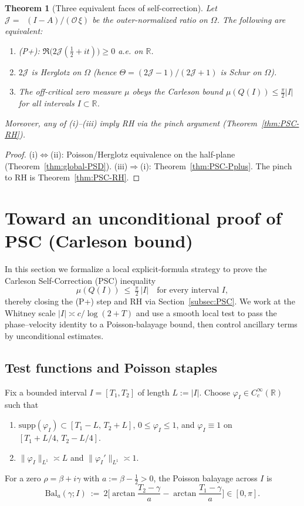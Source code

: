 \documentclass[11pt]{article}
\newtheorem{theorem}{Theorem}
\theoremstyle{definition}
\theoremstyle{remark}
\newcommand{\R}{\mathbb{R}}
\DeclareMathOperator{\dettwo}{det_2}
\begin{document}
\begin{theorem}[Three equivalent faces of self-correction]\label{thm:SC-equivalences}
Let $\mathcal J=\dettwo(I-A)/(\mathcal O\,\xi)$ be the outer-normalized ratio on $\Omega$. The following are equivalent:
\begin{enumerate}
\item[\textup{(i)}] \textup{(P+)}: $\Re\bigl(2\mathcal J(\tfrac12+it)\bigr)\ge 0$ a.e. on $\R$.
\item[\textup{(ii)}] $2\mathcal J$ is Herglotz on $\Omega$ (hence $\Theta=(2\mathcal J-1)/(2\mathcal J+1)$ is Schur on $\Omega$).
\item[\textup{(iii)}] The off-critical zero measure $\mu$ obeys the Carleson bound $\mu(Q(I))\le \tfrac{\pi}{2}|I|$ for all intervals $I\subset\R$.
\end{enumerate}
Moreover, any of (i)–(iii) imply RH via the pinch argument (Theorem~\ref{thm:PSC-RH}).
\end{theorem}
\begin{proof}
(i)$\Leftrightarrow$(ii): Poisson/Herglotz equivalence on the half-plane (Theorem~\ref{thm:global-PSD}). (iii)$\Rightarrow$(i): Theorem~\ref{thm:PSC-Pplus}. The pinch to RH is Theorem~\ref{thm:PSC-RH}.
\end{proof}


\section{Toward an unconditional proof of PSC (Carleson bound)}\label{sec:unconditional-psc-proof}
In this section we formalize a local explicit-formula strategy to prove the Carleson Self-Correction (PSC) inequality
\[ \mu(Q(I))\ \le\ \tfrac{\pi}{2}\,|I| \quad\text{for every interval } I, \]
thereby closing the (P+) step and RH via Section~\ref{subsec:PSC}. We work at the Whitney scale \(|I|\asymp c/\log(2+T)\) and use a smooth local test to pass the phase--velocity identity to a Poisson-balayage bound, then control ancillary terms by unconditional estimates.

\subsection{Test functions and Poisson staples}
Fix a bounded interval \(I=[T_1,T_2]\) of length \(L:=|I|\). Choose \(\varphi_I\in C_c^\infty(\R)\) such that
\begin{enumerate}
\item[(i)] \(\mathrm{supp}(\varphi_I)\subset [T_1-L,\,T_2+L]\), \(0\le\varphi_I\le 1\), and \(\varphi_I\equiv 1\) on \([T_1+L/4,\,T_2-L/4]\).
\item[(ii)] \(\|\varphi_I\|_{L^1}\asymp L\) and \(\|\varphi_I'\|_{L^1}\asymp 1\).
\end{enumerate}
For a zero \(\rho=\beta+i\gamma\) with \(a:=\beta-\tfrac12>0\), the Poisson balayage across \(I\) is
\[ \mathrm{Bal}_a(\gamma;I)\ :=\ 2\Big[\arctan\!\frac{T_2-\gamma}{a}-\arctan\!\frac{T_1-\gamma}{a}\Big] \in [0,\pi].\]
\end{document}
